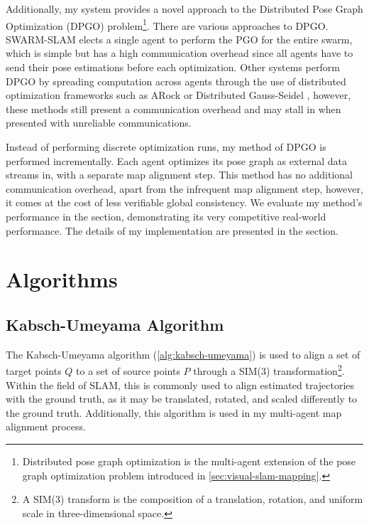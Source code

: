 Additionally, my system provides a novel approach to the Distributed Pose Graph Optimization (DPGO) problem\footnote[1]{Distributed pose graph optimization is the multi-agent extension of the pose graph optimization problem introduced in \autoref{sec:visual-slam-mapping}.}. There are various approaches to DPGO. SWARM-SLAM \autocite{Lajoie_2024} elects a single agent to perform the PGO for the entire swarm, which is simple but has a high communication overhead since all agents have to send their pose estimations before each optimization. Other systems perform DPGO by spreading computation across agents through the use of distributed optimization frameworks such as ARock \autocite{Peng_2016} or Distributed Gauss-Seidel \autocite{DBLP:journals/corr/ChoudharyCNRCD17}, however, these methods still present a communication overhead and may stall in when presented with unreliable communications.

Instead of performing discrete optimization runs, my method of DPGO is performed incrementally. Each agent optimizes its pose graph as external data streams in, with a separate map alignment step. This method has no additional communication overhead, apart from the infrequent map alignment step, however, it comes at the cost of less verifiable global consistency. We evaluate my method's performance in the  section, demonstrating its very competitive real-world performance. The details of my implementation are presented in the  section.


\section{Algorithms}
\label{sec:algorithms}

\subsection{Kabsch-Umeyama Algorithm}
\label{sec:kabsch-umeyama-algorithm}
The Kabsch-Umeyama algorithm (\autoref{alg:kabsch-umeyama}) is used to align a set of target points $Q$ to a set of source points $P$ through a SIM(3) transformation\footnote[2]{A SIM(3) transform is the composition of a translation, rotation, and uniform scale in three-dimensional space.}. Within the field of SLAM, this is commonly used to align estimated trajectories with the ground truth, as it may be translated, rotated, and scaled differently to the ground truth. Additionally, this algorithm is used in my multi-agent map alignment process.


